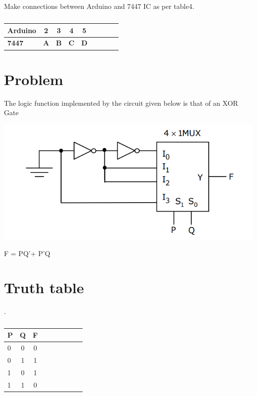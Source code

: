 \documentclass[10pt, a4paper]{article}
\begin{document}
Make connections between Arduino and 7447 IC as per table4.


\begin{table}[htbp]
 \begin{center}
    \begin{tabular}{|l|c|c|c|c|c|c|c|c} \hline \textbf{Arduino}
  & \textbf{2} & \textbf{3} & \textbf{4}& \textbf{5} \\
 \hline
 \textbf{7447}
  & \textbf{A} & \textbf{B} & \textbf{C}& \textbf{D} \\
 \hline
 
\end{tabular}   
\end{center}
\caption{\label{table:dummytable} }
\end{table}


\section{Problem}
The logic function implemented by the circuit given below is that of an XOR Gate

\includegraphics[scale=0.4]{cct.png}
\begin{center}
F = PQ'+ P'Q
\end{center}
        
\section{Truth table}
.
\begin{table}[htbp]
 \begin{center}
    \begin{tabular}{|l|c|c|c|c|c|c|c|c} \hline \textbf{P}
  & \textbf{Q} & \textbf{F} \\
 \hline
        0&0&0 \\
        \hline
        0&1&1 \\
        \hline
        1&0&1 \\
        \hline
        1&1&0 \\
        \hline
     
\end{tabular}   
\end{center}
\caption{\label{table:dummytable} }
\end{table}
\end{document}
